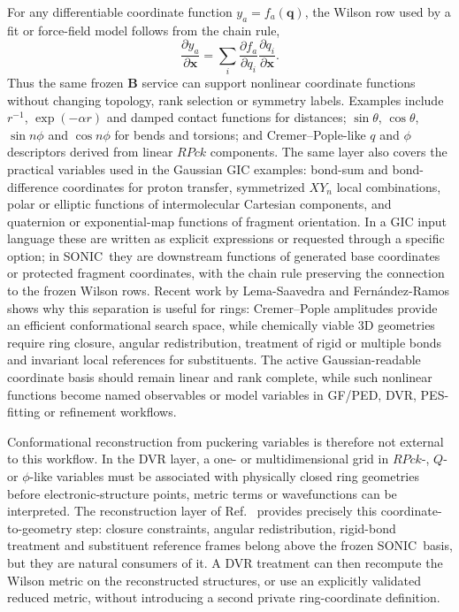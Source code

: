 \documentclass[journal=jctcce,manuscript=article,layout=traditional]{achemso}
\newcommand{\SONIC}{SONIC}
\newcommand{\Bmat}{\mathbf{B}}
\newcommand{\x}{\mathbf{x}}
\newcommand{\q}{\mathbf{q}}
\theoremstyle{definition}
\begin{document}
For any differentiable coordinate function \(y_a=f_a(\q)\), the Wilson row used
by a fit or force-field model follows from the chain rule,
\begin{equation}
  \label{eq:chain-rule}
  \frac{\partial y_a}{\partial \x}
  =
  \sum_i
  \frac{\partial f_a}{\partial q_i}
  \frac{\partial q_i}{\partial \x}.
\end{equation}
Thus the same frozen \(\Bmat\) service can support nonlinear coordinate
functions without changing topology, rank selection or symmetry labels.
Examples include \(r^{-1}\), \(\exp(-\alpha r)\) and damped contact functions
for distances; \(\sin\theta\), \(\cos\theta\), \(\sin n\phi\) and
\(\cos n\phi\) for bends and torsions; and Cremer--Pople-like \(q\) and
\(\phi\) descriptors derived from linear \(RPck\) components.  The same layer
also covers the practical variables used in the Gaussian GIC examples:
bond-sum and bond-difference coordinates for proton transfer, symmetrized
\(XY_n\) local combinations, polar or elliptic functions of intermolecular
Cartesian components, and quaternion or exponential-map functions of fragment
orientation.\cite{Marenich2025GIC}  In a GIC input language these are written
as explicit expressions or requested through a specific option; in \SONIC\ they
are downstream functions of generated base coordinates or protected fragment
coordinates, with the chain rule preserving the connection to the frozen
Wilson rows.  Recent work by
Lema-Saavedra and Fern{\'a}ndez-Ramos shows why this separation is useful for
rings: Cremer--Pople amplitudes provide an efficient conformational search
space, while chemically viable 3D geometries require ring closure, angular
redistribution, treatment of rigid or multiple bonds and invariant local
references for substituents.\cite{LemaSaavedraFernandezRamos2026RingCP}  The
active Gaussian-readable coordinate basis should remain linear and rank
complete, while such nonlinear functions become named observables or model
variables in GF/PED, DVR, PES-fitting or refinement workflows.

Conformational reconstruction from puckering variables is therefore not external
to this workflow.  In the DVR layer, a one- or multidimensional grid in
\(RPck\)-, \(Q\)- or \(\phi\)-like variables must be associated with physically
closed ring geometries before electronic-structure points, metric terms or
wavefunctions can be interpreted.  The reconstruction layer of
Ref.~ provides precisely this
coordinate-to-geometry step: closure constraints, angular redistribution,
rigid-bond treatment and substituent reference frames belong above the frozen
\SONIC\ basis, but they are natural consumers of it.  A DVR treatment can then
recompute the Wilson metric on the reconstructed structures, or use an explicitly
validated reduced metric, without introducing a second private ring-coordinate
definition.
\end{document}
